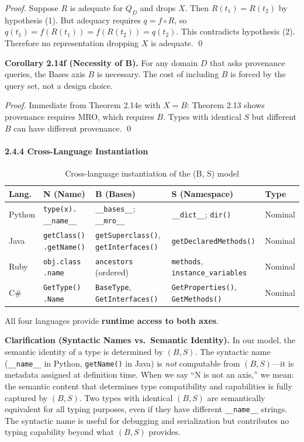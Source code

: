 \emph{Proof.} Suppose $R$ is adequate for $Q_D$ and drops $X$. Then $R(t_1) = R(t_2)$ by hypothesis (1). But adequacy requires $q = f \circ R$, so $q(t_1) = f(R(t_1)) = f(R(t_2)) = q(t_2)$. This contradicts hypothesis (2). Therefore no representation dropping $X$ is adequate. \qed

\textbf{Corollary 2.14f (Necessity of B).} For any domain $D$ that asks provenance queries, the Bases axis $B$ is necessary. The cost of including $B$ is forced by the query set, not a design choice.

\emph{Proof.} Immediate from Theorem 2.14e with $X = B$: Theorem 2.13 shows provenance requires MRO, which requires $B$. Types with identical $S$ but different $B$ can have different provenance. \qed

\paragraph{2.4.4 Cross-Language Instantiation}\label{cross-language-instantiation}

\begin{table}[h]
\caption{Cross-language instantiation of the (B, S) model}
\label{tab:nbs-cross}
\footnotesize
\setlength{\tabcolsep}{4pt}
\begin{tabular}{@{}p{1.1cm}p{2.6cm}p{3.2cm}p{3.2cm}p{1.2cm}@{}}
\toprule
Lang. & N (Name) & B (Bases) & S (Namespace) & Type \\
\midrule
Python & \texttt{type(x).} \texttt{\_\_name\_\_} & \texttt{\_\_bases\_\_}; \texttt{\_\_mro\_\_} & \texttt{\_\_dict\_\_}; \texttt{dir()} & Nominal \\
Java   & \texttt{getClass()} \texttt{.getName()} & \texttt{getSuperclass()}, \texttt{getInterfaces()} & \texttt{getDecl\-ared\-Methods()} & Nominal \\
Ruby   & \texttt{obj.class} \texttt{.name} & \texttt{ancestors} (ordered) & \texttt{methods}, \texttt{instance\_variables} & Nominal \\
C\#    & \texttt{GetType()} \texttt{.Name} & \texttt{BaseType}, \texttt{GetInterfaces()} & \texttt{GetProperties()}, \texttt{GetMethods()} & Nominal \\
\bottomrule
\end{tabular}
\end{table}

\bigskip

All four languages provide \textbf{runtime access to both axes}.

\textbf{Clarification (Syntactic Names vs.\ Semantic Identity).} In our model, the semantic identity of a type is determined by $(B, S)$. The syntactic name (\texttt{\_\_name\_\_} in Python, \texttt{getName()} in Java) is \emph{not} computable from $(B, S)$---it is metadata assigned at definition time. When we say ``N is not an axis,'' we mean: the semantic content that determines type compatibility and capabilities is fully captured by $(B, S)$. Two types with identical $(B, S)$ are semantically equivalent for all typing purposes, even if they have different \texttt{\_\_name\_\_} strings. The syntactic name is useful for debugging and serialization but contributes no typing capability beyond what $(B, S)$ provides.

